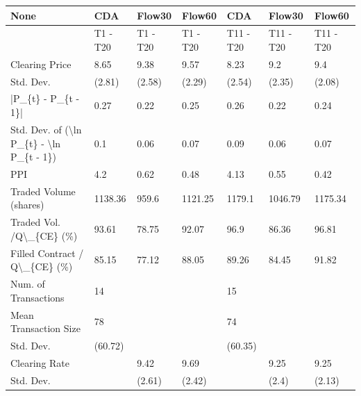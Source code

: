 \begin{tabular}{lllllll}
\hline
 None                                                      & CDA      & Flow30   & Flow60   & CDA       & Flow30    & Flow60    \\
\hline
                                                           & T1 - T20 & T1 - T20 & T1 - T20 & T11 - T20 & T11 - T20 & T11 - T20 \\
 Clearing Price                                            & 8.65     & 9.38     & 9.57     & 8.23      & 9.2       & 9.4       \\
 Std. Dev.                                                 & (2.81)   & (2.58)   & (2.29)   & (2.54)    & (2.35)    & (2.08)    \\
 |P\_\{t\} - P\_\{t - 1\}|                                       & 0.27     & 0.22     & 0.25     & 0.26      & 0.22      & 0.24      \\
 Std. Dev. of (\textbackslash{}ln P\_\{t\} - \textbackslash{}ln P\_\{t - 1\})                  & 0.1      & 0.06     & 0.07     & 0.09      & 0.06      & 0.07      \\
 PPI                                                       & 4.2      & 0.62     & 0.48     & 4.13      & 0.55      & 0.42      \\
 Traded Volume (shares)                                    & 1138.36  & 959.6    & 1121.25  & 1179.1    & 1046.79   & 1175.34   \\
 Traded Vol. /Q\textbackslash{}\_\{CE\} (\%)                                  & 93.61    & 78.75    & 92.07    & 96.9      & 86.36     & 96.81     \\
 Filled Contract / Q\textbackslash{}\_\{CE\} (\%)                             & 85.15    & 77.12    & 88.05    & 89.26     & 84.45     & 91.82     \\
 Num. of Transactions                                      & 14       &          &          & 15        &           &           \\
 Mean Transaction Size                                     & 78       &          &          & 74        &           &           \\
 Std. Dev.                                                 & (60.72)  &          &          & (60.35)   &           &           \\
 Clearing Rate                                             &          & 9.42     & 9.69     &           & 9.25      & 9.25      \\
 Std. Dev.                                                 &          & (2.61)   & (2.42)   &           & (2.4)     & (2.13)    \\

\end{tabular}
